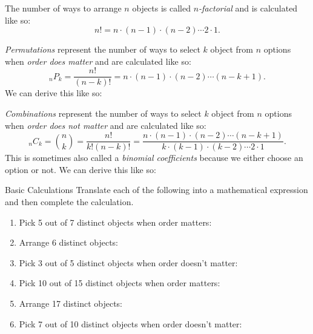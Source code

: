 \begin{defn}[Factorials]
    The number of ways to arrange \(n\) objects is called \emph{\(n\)-factorial} and is calculated like so:
    \[n!=n\cdot(n-1)\cdot(n-2)\cdots2\cdot1.\]
\end{defn}

\begin{defn}[Permutations]
    \emph{Permutations} represent the number of ways to select \(k\) object from \(n\) options when \emph{order does matter} and are calculated like so:
        \[_nP_k=\frac{n!}{(n-k)!}=n\cdot(n-1)\cdot(n-2)\cdots(n-k+1).\]
    We can derive this like so:\vspace{0.2\textheight}
\end{defn}

\begin{defn}[Combinations]
    \emph{Combinations} represent the number of ways to select \(k\) object from \(n\) options when \emph{order does not matter} and are calculated like so:
        \[_nC_k=\binom{n}{k}=\frac{n!}{k!(n-k)!}=\frac{n\cdot(n-1)\cdot(n-2)\cdots(n-k+1)}{k\cdot(k-1)\cdot(k-2)\cdots2\cdot1}.\]
    This is sometimes also called a \emph{binomial coefficients} because we either choose an option or not.
    We can derive this like so:\vspace{0.2\textheight}
\end{defn}

\clearpage

\begin{practiceprob}{Basic Calculations}
    Translate each of the following into a mathematical expression and then complete the calculation.
    \begin{enumerate}
    \setlength{\itemsep}{70pt}
        \item Pick 5 out of 7 distinct objects when order matters:
        \item Arrange 6 distinct objects:
        \item Pick 3 out of 5 distinct objects when order doesn't matter:
        \item Pick 10 out of 15 distinct objects when order matters:
        \item Arrange 17 distinct objects:
        \item Pick 7 out of 10 distinct objects when order doesn't matter:\vspace{70pt}
    \end{enumerate}
\end{practiceprob}

